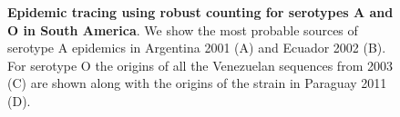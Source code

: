 \documentclass[10pt]{article}
\begin{document}
\begin{figure}[!ht]
\begin{center}
\end{center}
\caption{\textbf{Epidemic tracing using robust counting for serotypes A and O in South America}.
We show the most probable sources of serotype A epidemics in Argentina 2001 (A) and Ecuador 2002 (B).
For serotype O the origins of all the Venezuelan sequences from 2003 (C) are shown along with the origins of the strain in Paraguay 2011 (D).
}
\label{fig:epidemictracing}
\end{figure}
\end{document}
